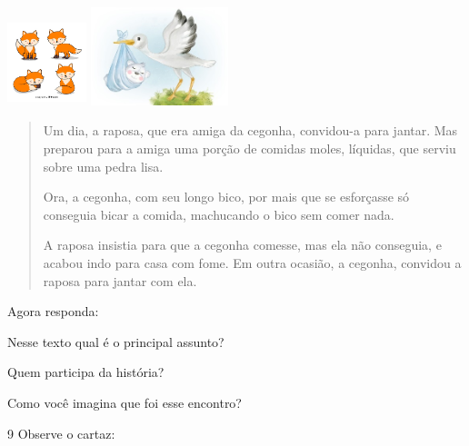 \includegraphics[width=0.90625in,height=0.98597in]{media/image121.jpeg}
\includegraphics[width=1.57292in,height=1.12292in]{media/image122.jpeg}

\begin{quote}
Um dia, a raposa, que era amiga da cegonha, convidou-a para jantar. Mas
preparou para a amiga uma porção de comidas moles, líquidas, que serviu
sobre uma pedra lisa.

Ora, a cegonha, com seu longo bico, por mais que se esforçasse só
conseguia bicar a comida, machucando o bico sem comer nada.

A raposa insistia para que a cegonha comesse, mas ela não conseguia, e
acabou indo para casa com fome. Em outra ocasião, a cegonha, convidou a
raposa para jantar com ela.
\end{quote}


Agora responda:

\begin{escolha}
\item Nesse texto qual é o principal assunto?


\item Quem participa da história?


\item Como você imagina que foi esse encontro? %

\end{escolha}

\num{9} Observe o cartaz:

